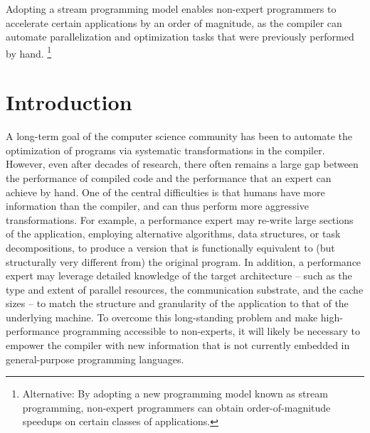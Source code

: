 


Adopting a stream programming model enables non-expert programmers to
accelerate certain applications by an order of magnitude, as the
compiler can automate parallelization and optimization tasks that were
previously performed by hand.
%
\footnote{Alternative: 
By adopting a new programming model known as stream programming,
non-expert programmers can obtain order-of-magnitude speedups on
certain classes of applications.
}

\section{Introduction}

A long-term goal of the computer science community has been to
automate the optimization of programs via systematic transformations
in the compiler.  However, even after decades of research, there often
remains a large gap between the performance of compiled code and the
performance that an expert can achieve by hand.  One of the central
difficulties is that humans have more information than the compiler,
and can thus perform more aggressive transformations.  For example, a
performance expert may re-write large sections of the application,
employing alternative algorithms, data structures, or task
decompositions, to produce a version that is functionally equivalent
to (but structurally very different from) the original program.  In
addition, a performance expert may leverage detailed knowledge of the
target architecture -- such as the type and extent of parallel
resources, the communication substrate, and the cache sizes -- to
match the structure and granularity of the application to that of the
underlying machine.  To overcome this long-standing problem and make
high-performance programming accessible to non-experts, it will likely
be necessary to empower the compiler with new information that is not
currently embedded in general-purpose programming languages.

